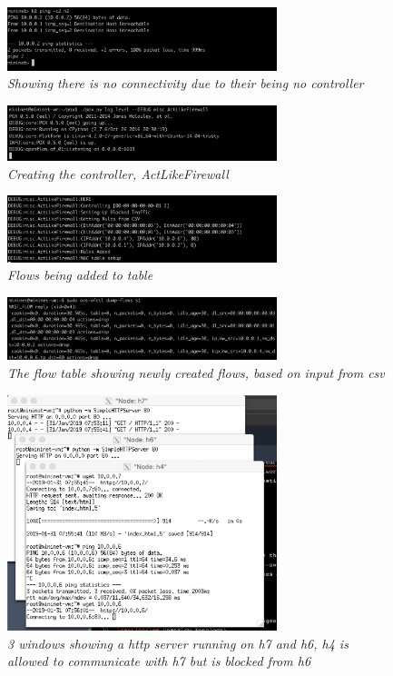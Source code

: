 \begin{figure}[!ht]
\centering
\includegraphics*[width=0.7\textwidth]{images/o2.png}
\caption{\em Showing there is no connectivity due to their being no controller}
\label{img:o2}
\end{figure}

\begin{figure}[!ht]
\centering
\includegraphics*[width=0.7\textwidth]{images/o3.png}
\caption{\em Creating the controller, ActLikeFirewall}
\label{img:o3}
\end{figure}

\begin{figure}[!ht]
\centering
\includegraphics*[width=0.7\textwidth]{images/o4.png}
\caption{\em Flows being added to table}
\label{img:o4}
\end{figure}

\begin{figure}[!ht]
\centering
\includegraphics*[width=0.7\textwidth]{images/o5.png}
\caption{\em The flow table showing newly created flows, based on input from csv}
\label{img:o5}
\end{figure}

\begin{figure}[!ht]
\centering
\includegraphics*[width=0.7\textwidth]{images/o6.png}
\caption{\em 3 windows showing a http server running on h7 and h6, h4 is allowed to communicate with h7 but is blocked from h6}
\label{img:o6}
\end{figure}

